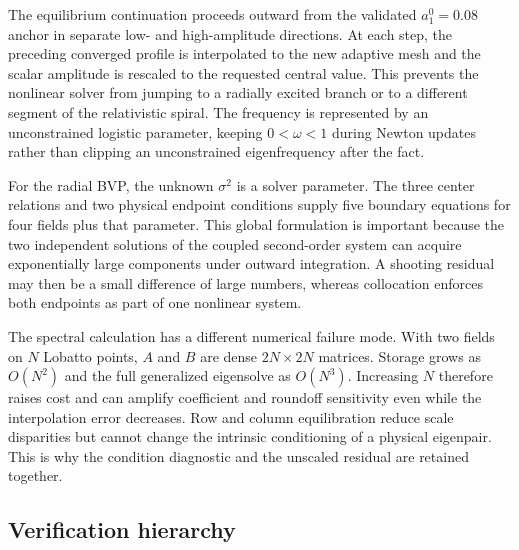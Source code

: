\documentclass[aps,prd,preprint,onecolumn,nofootinbib,superscriptaddress,showkeys]{revtex4-2}
\newcommand{\sigmatwo}{\sigma^{2}}
\begin{document}
The equilibrium continuation proceeds outward from the validated $a_1^0=0.08$ anchor in separate low- and high-amplitude directions. At each step, the preceding converged profile is interpolated to the new adaptive mesh and the scalar amplitude is rescaled to the requested central value. This prevents the nonlinear solver from jumping to a radially excited branch or to a different segment of the relativistic spiral. The frequency is represented by an unconstrained logistic parameter, keeping $0<\omega<1$ during Newton updates rather than clipping an unconstrained eigenfrequency after the fact.

For the radial BVP, the unknown $\sigmatwo$ is a solver parameter. The three center relations and two physical endpoint conditions supply five boundary equations for four fields plus that parameter. This global formulation is important because the two independent solutions of the coupled second-order system can acquire exponentially large components under outward integration. A shooting residual may then be a small difference of large numbers, whereas collocation enforces both endpoints as part of one nonlinear system.

The spectral calculation has a different numerical failure mode. With two fields on $N$ Lobatto points, $A$ and $B$ are dense $2N\times2N$ matrices. Storage grows as $O(N^2)$ and the full generalized eigensolve as $O(N^3)$. Increasing $N$ therefore raises cost and can amplify coefficient and roundoff sensitivity even while the interpolation error decreases. Row and column equilibration reduce scale disparities but cannot change the intrinsic conditioning of a physical eigenpair. This is why the condition diagnostic and the unscaled residual are retained together.

\subsection{Verification hierarchy}
\end{document}
